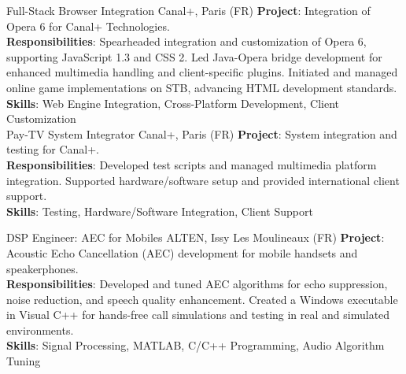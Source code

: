 \documentclass[
  a4paper,
   maincolor=cvblue,
   sectioncolor=cvblue,
]{fortysecondscv}
\begin{document}
\begin{cvtable}
    {Full-Stack Browser Integration}
    {Canal+,  Paris (FR)}
    {
      \textbf{Project}: Integration of Opera 6 for Canal+ Technologies.\\
      \textbf{Responsibilities}:
          Spearheaded integration and customization of Opera 6, supporting JavaScript 1.3 and CSS 2.
          Led Java-Opera bridge development for enhanced multimedia handling and client-specific plugins.
          Initiated and managed online game implementations on STB, advancing HTML development standards.\\
      \textbf{Skills}: Web Engine Integration, Cross-Platform Development, Client Customization\\
    }
    {Pay-TV System Integrator}
    {Canal+,  Paris (FR)}
    {
      \textbf{Project}: System integration and testing for Canal+.\\
      \textbf{Responsibilities}:
          Developed test scripts and managed multimedia platform integration.
          Supported hardware/software setup and provided international client support.\\
      \textbf{Skills}: Testing, Hardware/Software Integration, Client Support\\
    }

    {DSP Engineer: AEC for Mobiles}
    {ALTEN, Issy Les Moulineaux (FR)}
    {
      \textbf{Project}: Acoustic Echo Cancellation (AEC) development for mobile handsets and speakerphones.\\
      \textbf{Responsibilities}:
          Developed and tuned AEC algorithms for echo suppression, noise reduction, and speech quality enhancement.
          Created a Windows executable in Visual C++ for hands-free call simulations and testing in real and simulated environments.\\
      \textbf{Skills}: Signal Processing, MATLAB, C/C++ Programming, Audio Algorithm Tuning
    }


\end{cvtable}
\end{document}
